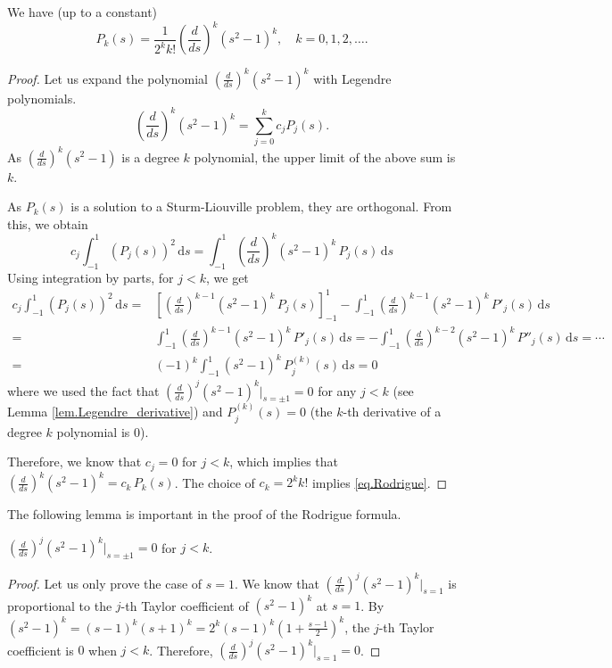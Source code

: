 \begin{proposition} We have (up to a constant)
\begin{equation}\label{eq.Rodrigue}
    P_k(s)=\frac{1}{2^k k!}\left(\frac{d}{d s}\right)^k\left(s^2-1\right)^k, \quad k=0,1,2, \ldots .
\end{equation}
\end{proposition}
\begin{proof}
Let us expand the polynomial $\left(\frac{d}{d s}\right)^k\left(s^2-1\right)^k$ with Legendre polynomials.
$$
    \left(\frac{d}{d s}\right)^k\left(s^2-1\right)^k=\sum_{j=0}^k c_j P_j(s).
$$
As $\left(\frac{d}{d s}\right)^k\left(s^2-1\right)$ is a degree $k$ polynomial, the upper limit of the above sum is $k$.

As $P_k(s)$ is a solution to a Sturm-Liouville problem, they are orthogonal. From this, we obtain
\[
    c_j \int_{-1}^1 (P_j(s))^2\, \mathrm{d}s = \int_{-1}^1\left(\frac{d}{d s}\right)^k\left(s^2-1\right)^k\, P_j(s)\, \mathrm{d}s
\]
Using integration by parts, for $j < k$, we get
\[
\begin{split}
    c_j \int_{-1}^1 (P_j(s))^2\, \mathrm{d}s =& \left[\left(\frac{d}{d s}\right)^{k-1}\left(s^2-1\right)^k\, P_j(s)\right]_{-1}^1 - \int_{-1}^1\left(\frac{d}{d s}\right)^{k-1}\left(s^2-1\right)^k\, P'_j(s)\, \mathrm{d}s
    \\
    =& \int_{-1}^1\left(\frac{d}{d s}\right)^{k-1}\left(s^2-1\right)^k\, P'_j(s)\, \mathrm{d}s = - \int_{-1}^1\left(\frac{d}{d s}\right)^{k-2}\left(s^2-1\right)^k\, P''_j(s)\, \mathrm{d}s = \cdots
    \\
    =& (-1)^k \int_{-1}^1\left(s^2-1\right)^k\, P^{(k)}_j(s)\, \mathrm{d}s = 0
\end{split}
\]
where we used the fact that $\left(\frac{d}{d s}\right)^j\left(s^2-1\right)^k|_{s = \pm 1} = 0$ for any $j < k$ (see Lemma \ref{lem.Legendre_derivative}) and $P^{(k)}_j(s) = 0$ (the $k$-th derivative of a degree $k$ polynomial is $0$).

Therefore, we know that $c_j=0$ for $j<k$, which implies that $ \left(\frac{d}{d s}\right)^k\left(s^2-1\right)^k= c_k\, P_k(s)$. The choice of $c_k = 2^k k!$ implies \eqref{eq.Rodrigue}.
\end{proof}

The following lemma is important in the proof of the Rodrigue formula.
\begin{lemma}[]\label{lem.Legendre_derivative}
    $\left(\frac{d}{d s}\right)^j\left(s^2-1\right)^k|_{s = \pm 1} = 0$ for $j < k$.
\end{lemma}
\begin{proof}
Let us only prove the case of $s = 1$. We know that $\left(\frac{d}{d s}\right)^j\left(s^2-1\right)^k|_{s = 1}$ is proportional to the $j$-th Taylor coefficient of $\left(s^2-1\right)^k$ at $s = 1$. By $\left(s^2-1\right)^k = (s-1)^k(s+1)^k = 2^k(s-1)^k(1 + \frac{s-1}{2})^k$, the $j$-th Taylor coefficient is $0$ when $j < k$. Therefore, $\left(\frac{d}{d s}\right)^j\left(s^2-1\right)^k|_{s = 1} = 0$.
\end{proof}


